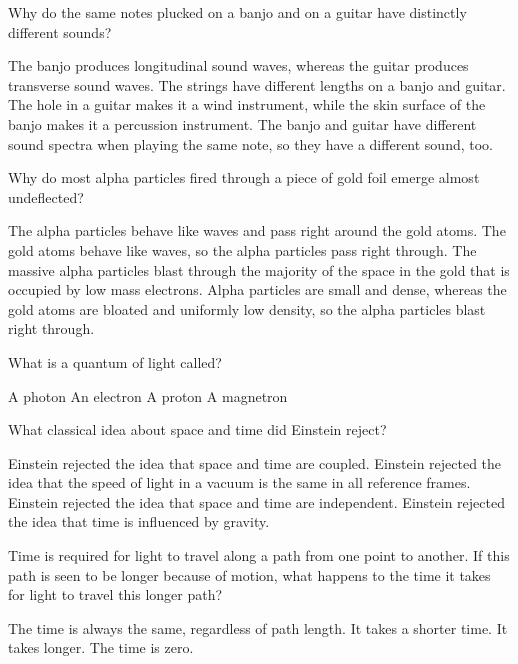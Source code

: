 \documentclass{exam}
\begin{document}
\begin{questions}
\question Why do the same notes plucked on a banjo and on a guitar have distinctly different sounds?
\begin{choices}
  \choice The banjo produces longitudinal sound waves, whereas the guitar produces transverse sound waves.
  \choice The strings have different lengths on a banjo and guitar.
  \choice The hole in a guitar makes it a wind instrument, while the skin surface of the banjo makes it a percussion instrument.
  \choice The banjo and guitar have different sound spectra when playing the same note, so they have a different sound, too.
\end{choices}
\vfill{}

\newpage{}

\question Why do most alpha particles fired through a piece of gold foil emerge almost undeflected?
\begin{choices}
  \choice The alpha particles behave like waves and pass right around the gold atoms.
  \choice The gold atoms behave like waves, so the alpha particles pass right through.
  \choice The massive alpha particles blast through the majority of the space in the gold that is occupied by low mass electrons.
  \choice Alpha particles are small and dense, whereas the gold atoms are bloated and uniformly low density, so the alpha particles blast right through.
\end{choices}
\vfill{}

\question What is a quantum of light called?
\begin{choices}
  \choice A photon
  \choice An electron
  \choice A proton
  \choice A magnetron
\end{choices}
\vfill{}

\question What classical idea about space and time did Einstein reject?
\begin{choices}
  \choice Einstein rejected the idea that space and time are coupled.
  \choice Einstein rejected the idea that the speed of light in a vacuum is the same in all reference frames.
  \choice Einstein rejected the idea that space and time are independent.
  \choice Einstein rejected the idea that time is influenced by gravity.
\end{choices}
\vfill{}

\question Time is required for light to travel along a path from one point to another. If this path is seen to be longer because of motion, what happens to the time it takes for light to travel this longer path?
\begin{choices}
  \choice The time is always the same, regardless of path length.
  \choice It takes a shorter time.
  \choice It takes longer.
  \choice The time is zero.
\end{choices}
\vfill{}


\end{questions}
\end{document}
